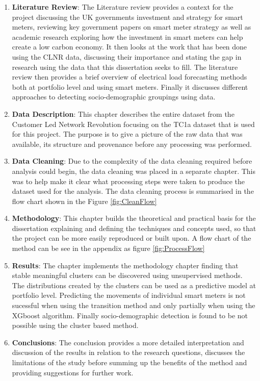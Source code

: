 \begin{enumerate}
\setcounter{enumi}{0}
\item \textbf{Literature Review}: The Literature review provides a context for the project discussing the UK governments investment and strategy for smart meters, reviewing key government papers on smart meter strategy as well as academic research exploring how the investment in smart meters can help create a low carbon economy. It then looks at the work that has been done using the CLNR data, discussing their importance and stating the gap in research using the data that this dissertation seeks to fill. The literature review then provides a brief overview of electrical load forecasting methods both at portfolio level and using smart meters. Finally it discusses different approaches to detecting socio-demographic groupings using data.

\item \textbf{Data Description}: This chapter describes the entire dataset from the Customer Led Network Revolution focusing on the TC1a dataset that is used for this project. The purpose is to give a picture of the raw data that was available, its structure and provenance before any processing was performed. 

\item \textbf{Data Cleaning}: Due to the complexity of the data cleaning required before analysis could begin, the data cleaning was placed in a separate chapter. This was to help make it clear what processing steps were taken to produce the dataset used for the analysis. The data cleaning process is summarised in the flow chart shown in the Figure \ref{fig:CleanFlow}


\item \textbf{Methodology}: This chapter builds the theoretical and practical basis for the dissertation explaining and defining the techniques and concepts used, so that the project can be more easily reproduced or built upon. A flow chart of the method can be see in the appendix as figure \ref{fig:ProcessFlow}

\item \textbf{Results}: The chapter implements the methodology chapter finding that stable meaningful clusters can be discovered using unsupervised methods. The distributions created by the clusters can be used as a predictive model at portfolio level. Predicting the movements of individual smart meters is not sucessful when using the transition method and only partially when using the XGboost algorithm. Finally socio-demographic detection is found to be not possible using the cluster based method.

\item \textbf{Conclusions}: The conclusion provides a more detailed interpretation and discussion of the results in relation to the research questions, discusses the limitations of the study before summing up the benefits of the method and providing suggestions for further work.

\end{enumerate}


